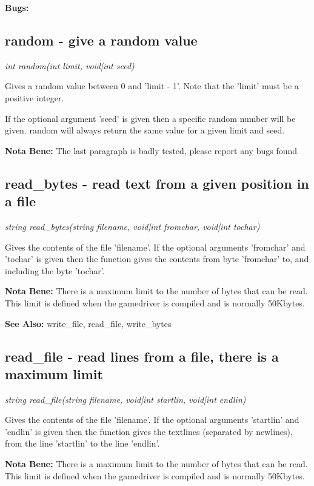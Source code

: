     {\bf Bugs: }

\subsection{random - give a random value}

    {\em int random(int limit, void|int seed)}
    
    Gives a random value between 0 and 'limit - 1'. Note that the 'limit'
    must be a positive integer.

    If the optional argument 'seed' is given then a specific random
    number will be given. random will always return the same value
    for a given limit and seed.

    {\bf Nota Bene: }   The last paragraph is badly tested, please report any bugs found



\subsection{read\_bytes - read text from a given position in a file}

    {\em string read\_bytes(string filename, void|int fromchar, void|int tochar)}

    Gives the contents of the file 'filename'. If the optional arguments
    'fromchar' and 'tochar' is given then the function gives the contents
    from byte 'fromchar' to, and including the byte 'tochar'.

    {\bf Nota Bene: }   There is a maximum limit to the number of bytes that can be read. This
    limit is defined when the gamedriver is compiled and is normally
    50Kbytes.

    {\bf See Also: }    write\_file, read\_file, write\_bytes


\subsection{read\_file - read lines from a file, there is a maximum limit}

    {\em string read\_file(string filename, void|int startlin, void|int endlin)}

    Gives the contents of the file 'filename'. If the optional arguments
    'startlin' and 'endlin' is given then the function gives the textlines
    (separated by newlines), from the line 'startlin' to the line 'endlin'.

    {\bf Nota Bene: }   There is a maximum limit to the number of bytes that can be read. This
    limit is defined when the gamedriver is compiled and is normally
    50Kbytes.

